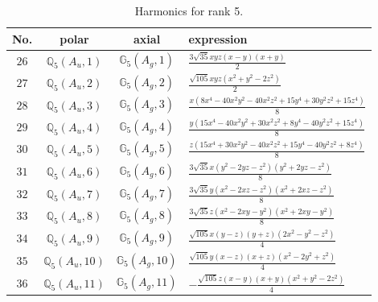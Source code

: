 \documentclass[fleqn,8pt,landscape]{jsarticle}
\begin{document}
\begin{table}[ht!]
\begin{center}
\caption{Harmonics for rank 5.}
\renewcommand{\arraystretch}{1.3}
\begin{tabular}{cccl} \hline \hline
No. & polar & axial & expression \\ \hline
$ 26 $ & $ \mathbb{Q}_{5}(A_{u},1) $ & $ \mathbb{G}_{5}(A_{g},1) $ & $ \frac{3 \sqrt{35} x y z \left(x - y\right) \left(x + y\right)}{2} $ \\
$ 27 $ & $ \mathbb{Q}_{5}(A_{u},2) $ & $ \mathbb{G}_{5}(A_{g},2) $ & $ \frac{\sqrt{105} x y z \left(x^{2} + y^{2} - 2 z^{2}\right)}{2} $ \\
$ 28 $ & $ \mathbb{Q}_{5}(A_{u},3) $ & $ \mathbb{G}_{5}(A_{g},3) $ & $ \frac{x \left(8 x^{4} - 40 x^{2} y^{2} - 40 x^{2} z^{2} + 15 y^{4} + 30 y^{2} z^{2} + 15 z^{4}\right)}{8} $ \\
$ 29 $ & $ \mathbb{Q}_{5}(A_{u},4) $ & $ \mathbb{G}_{5}(A_{g},4) $ & $ \frac{y \left(15 x^{4} - 40 x^{2} y^{2} + 30 x^{2} z^{2} + 8 y^{4} - 40 y^{2} z^{2} + 15 z^{4}\right)}{8} $ \\
$ 30 $ & $ \mathbb{Q}_{5}(A_{u},5) $ & $ \mathbb{G}_{5}(A_{g},5) $ & $ \frac{z \left(15 x^{4} + 30 x^{2} y^{2} - 40 x^{2} z^{2} + 15 y^{4} - 40 y^{2} z^{2} + 8 z^{4}\right)}{8} $ \\
$ 31 $ & $ \mathbb{Q}_{5}(A_{u},6) $ & $ \mathbb{G}_{5}(A_{g},6) $ & $ \frac{3 \sqrt{35} x \left(y^{2} - 2 y z - z^{2}\right) \left(y^{2} + 2 y z - z^{2}\right)}{8} $ \\
$ 32 $ & $ \mathbb{Q}_{5}(A_{u},7) $ & $ \mathbb{G}_{5}(A_{g},7) $ & $ \frac{3 \sqrt{35} y \left(x^{2} - 2 x z - z^{2}\right) \left(x^{2} + 2 x z - z^{2}\right)}{8} $ \\
$ 33 $ & $ \mathbb{Q}_{5}(A_{u},8) $ & $ \mathbb{G}_{5}(A_{g},8) $ & $ \frac{3 \sqrt{35} z \left(x^{2} - 2 x y - y^{2}\right) \left(x^{2} + 2 x y - y^{2}\right)}{8} $ \\
$ 34 $ & $ \mathbb{Q}_{5}(A_{u},9) $ & $ \mathbb{G}_{5}(A_{g},9) $ & $ \frac{\sqrt{105} x \left(y - z\right) \left(y + z\right) \left(2 x^{2} - y^{2} - z^{2}\right)}{4} $ \\
$ 35 $ & $ \mathbb{Q}_{5}(A_{u},10) $ & $ \mathbb{G}_{5}(A_{g},10) $ & $ \frac{\sqrt{105} y \left(x - z\right) \left(x + z\right) \left(x^{2} - 2 y^{2} + z^{2}\right)}{4} $ \\
$ 36 $ & $ \mathbb{Q}_{5}(A_{u},11) $ & $ \mathbb{G}_{5}(A_{g},11) $ & $ - \frac{\sqrt{105} z \left(x - y\right) \left(x + y\right) \left(x^{2} + y^{2} - 2 z^{2}\right)}{4} $ \\
 \hline \hline
\end{tabular}
\end{center}
\end{table}
\end{document}
